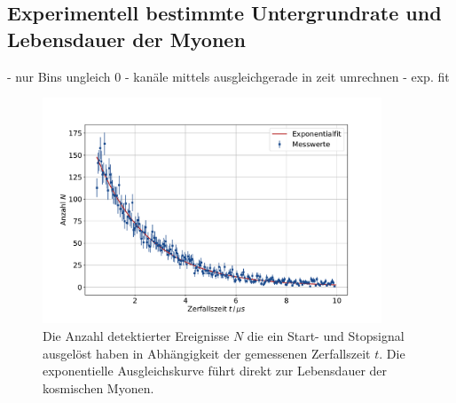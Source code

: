 \subsection{Experimentell bestimmte Untergrundrate und Lebensdauer der Myonen}
- nur Bins ungleich 0
- kanäle mittels ausgleichgerade in zeit umrechnen
- exp. fit

\begin{figure}
    \centering
    \includegraphics[width=0.9\textwidth]{content/plots/lifetime.pdf}
    \caption{Die Anzahl detektierter Ereignisse $N$ die ein Start- und Stopsignal ausgelöst haben in Abhängigkeit der gemessenen Zerfallszeit $t$.
    Die exponentielle Ausgleichskurve führt direkt zur Lebensdauer der kosmischen Myonen.
    }
    \label{fig:lebensdauer}
\end{figure}
